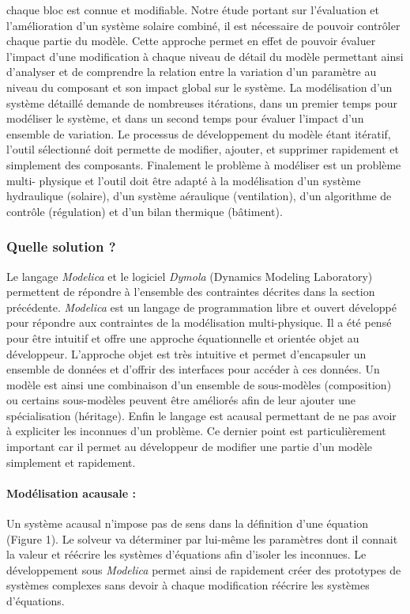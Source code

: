 chaque bloc est connue et modifiable. Notre étude portant sur l’évaluation et
l’amélioration d’un système solaire combiné, il est nécessaire de pouvoir contrôler chaque
partie du modèle. Cette approche permet en effet de pouvoir évaluer l’impact d’une
modification à chaque niveau de détail du modèle permettant ainsi d’analyser et de
comprendre la relation entre la variation d’un paramètre au niveau du composant et son
impact global sur le système. La modélisation d’un système détaillé demande de nombreuses
itérations, dans un premier temps pour modéliser le système, et dans un second temps pour
évaluer l’impact d’un ensemble de variation. Le processus de développement du modèle étant
itératif, l’outil sélectionné doit permette de modifier, ajouter, et supprimer rapidement
et simplement des composants. Finalement le problème à modéliser est un problème multi-
physique et l’outil doit être adapté à la modélisation d’un système hydraulique (solaire),
d’un système aéraulique (ventilation), d’un algorithme de contrôle (régulation) et d’un
bilan thermique (bâtiment).


\subsubsection{Quelle solution ?} %
\label{ssub:quelle_solution}
Le langage \textit{Modelica} et le logiciel \textit{Dymola} (Dynamics Modeling Laboratory) permettent de
répondre à l’ensemble des contraintes décrites dans la section précédente. \textit{Modelica} est un
langage de programmation libre et ouvert développé pour répondre aux contraintes de la
modélisation multi-physique. Il a été pensé pour être intuitif et offre une approche
équationnelle et orientée objet au développeur. L’approche objet est très intuitive et
permet d’encapsuler un ensemble de données et d’offrir des interfaces pour accéder à ces
données. Un modèle est ainsi une combinaison d’un ensemble de sous-modèles (composition)
ou certains sous-modèles peuvent être améliorés afin de leur ajouter une spécialisation
(héritage). Enfin le langage est acausal permettant de ne pas avoir à expliciter les
inconnues d’un problème. Ce dernier point est particulièrement important car il permet au
développeur de modifier une partie d’un modèle simplement et rapidement.

\paragraph{Modélisation acausale :} %
\label{par:modelisation_acausale}
Un système acausal n’impose pas de sens dans la définition d’une équation (Figure 1).  Le
solveur va déterminer par lui-même les paramètres dont il connait la valeur et réécrire
les systèmes d’équations afin d’isoler les inconnues. Le développement sous \textit{Modelica}
permet ainsi de rapidement créer des prototypes de systèmes complexes sans devoir à chaque
modification réécrire les systèmes d’équations.

